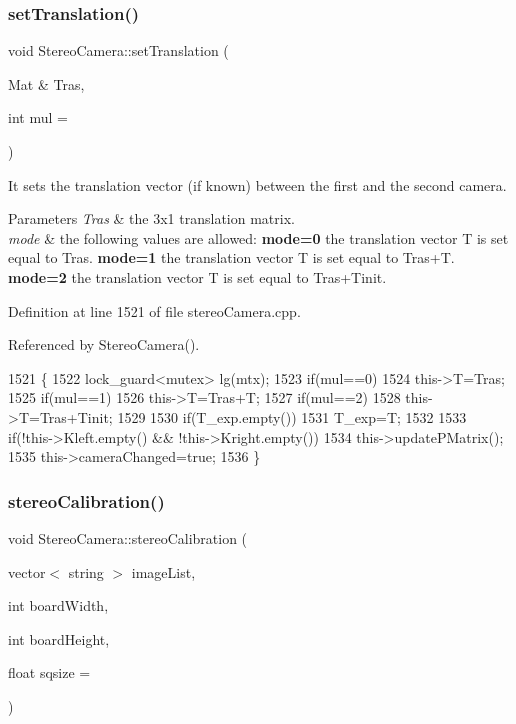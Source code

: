 \subsubsection{\texorpdfstring{set\+Translation()}{setTranslation()}}
{\footnotesize\ttfamily void Stereo\+Camera\+::set\+Translation (\begin{DoxyParamCaption}\item[{Mat \&}]{Tras,  }\item[{int}]{mul = {} }\end{DoxyParamCaption})}



It sets the translation vector (if known) between the first and the second camera. 


\begin{DoxyParams}{Parameters}
{\em Tras} & the 3x1 translation matrix. \\
\hline
{\em mode} & the following values are allowed\+: {\bfseries mode=0} the translation vector T is set equal to Tras. {\bfseries mode=1} the translation vector T is set equal to Tras+T. {\bfseries mode=2} the translation vector T is set equal to Tras+\+Tinit. \\
\hline
\end{DoxyParams}


Definition at line 1521 of file stereo\+Camera.\+cpp.



Referenced by Stereo\+Camera().


\begin{DoxyCode}
1521                                                     \{
1522     lock\_guard<mutex> lg(mtx);
1523     \textcolor{keywordflow}{if}(mul==0)
1524         this->T=Tras;
1525     \textcolor{keywordflow}{if}(mul==1)
1526         this->T=Tras+T;
1527     \textcolor{keywordflow}{if}(mul==2)
1528         this->T=Tras+Tinit;
1529 
1530     \textcolor{keywordflow}{if}(T\_exp.empty())
1531         T\_exp=T;
1532 
1533     \textcolor{keywordflow}{if}(!this->Kleft.empty() && !this->Kright.empty())
1534         this->updatePMatrix();
1535     this->cameraChanged=\textcolor{keyword}{true};
1536 \}
\end{DoxyCode}
\mbox{\label{classStereoCamera_a398f45eeefe7979a834659cfbb7a6961}} 
\subsubsection{\texorpdfstring{stereo\+Calibration()}{stereoCalibration()}}
{\footnotesize\ttfamily void Stereo\+Camera\+::stereo\+Calibration (\begin{DoxyParamCaption}\item[{vector$<$ string $>$}]{image\+List,  }\item[{int}]{board\+Width,  }\item[{int}]{board\+Height,  }\item[{float}]{sqsize = {} }\end{DoxyParamCaption})}



